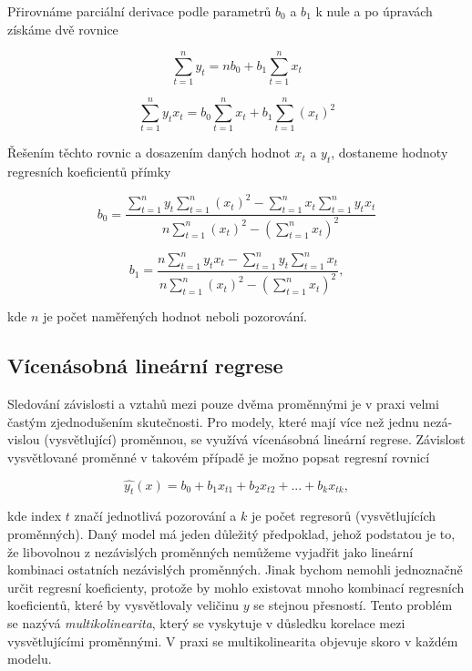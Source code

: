 \documentclass[a4paper,12pt,twoside]{scrreprt}
\begin{document}
Přirovnáme parciální derivace podle parametrů $b_0$ a $b_1$ k nule a po úpravách získáme dvě rovnice

\begin{equation}
\sum_{t=1}^{n}y_t = nb_0 + b_1\sum_{t=1}^{n}x_t
\end{equation}

\begin{equation}
\sum_{t=1}^{n}y_tx_t = b_0\sum_{t=1}^{n}x_t + b_1\sum_{t=1}^{n}(x_t)^2
\end{equation}

Řešením těchto rovnic a dosazením daných hodnot $x_t$ a $y_t$, dostaneme hodnoty regresních koeficientů přímky

\begin{equation}
b_0 = \frac{\sum_{t=1}^{n}y_t\sum_{t=1}^{n}(x_t)^2 - \sum_{t=1}^{n}x_t\sum_{t=1}^{n}y_tx_t} {n\sum_{t=1}^{n}(x_t)^2 - (\sum_{t=1}^{n}x_t)^2} 
\end{equation}

\begin{equation}
b_1 = \frac{n\sum_{t=1}^{n}y_tx_t - \sum_{t=1}^{n}y_t\sum_{t=1}^{n}x_t} {n\sum_{t=1}^{n}(x_t)^2 - (\sum_{t=1}^{n}x_t)^2},
\end{equation}

kde $n$ je počet naměřených hodnot neboli pozorování. 

\subsection{Vícenásobná lineární regrese}

Sledování závislosti a vztahů mezi pouze dvěma proměnnými je v praxi velmi častým zjednodušením skutečnosti. Pro modely, které mají více než jednu nezá-vislou (vysvětlující) proměnnou, se využívá vícenásobná lineární regrese. Závislost vysvětlované proměnné v takovém případě je možno popsat regresní rovnicí 

\begin{equation}
\hat{y_t}(x) = b_0 + b_1x_{t1} + b_2x_{t2} + ... + b_kx_{tk},
\end{equation}

kde index $t$ značí jednotlivá pozorování a $k$ je počet regresorů (vysvětlujících proměnných). Daný model má jeden důležitý předpoklad, jehož podstatou je to, že libovolnou z nezávislých proměnných nemůžeme vyjadřit jako lineární kombinaci ostatních nezávislých proměnných. Jinak bychom nemohli jednoznačně určit regresní koeficienty, protože by mohlo existovat mnoho kombinací regresních koeficientů, které by vysvětlovaly veličinu $y$ se stejnou přesností. Tento problém se nazývá \textit{multikolinearita}, který se vyskytuje v důsledku korelace mezi vysvětlujícími proměnnými. V praxi se multikolinearita objevuje skoro v každém modelu.
\end{document}
